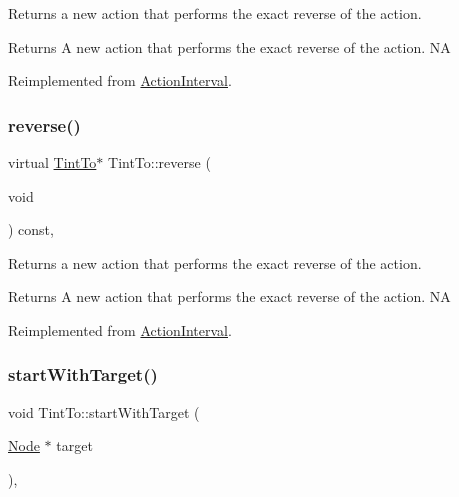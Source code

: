 Returns a new action that performs the exact reverse of the action.

\begin{DoxyReturn}{Returns}
A new action that performs the exact reverse of the action.  NA 
\end{DoxyReturn}


Reimplemented from \hyperlink{classActionInterval_a9f9ac7164036a0bc261a72f62a2b2da7}{Action\+Interval}.

\mbox{\label{classTintTo_af54618f49845bf509f510705e3acfc1f}} 
\subsubsection{\texorpdfstring{reverse()}{reverse()}\hspace{0.1cm}{\footnotesize\ttfamily [2/2]}}
{\footnotesize\ttfamily virtual \hyperlink{classTintTo}{Tint\+To}$\ast$ Tint\+To\+::reverse (\begin{DoxyParamCaption}\item[{void}]{ }\end{DoxyParamCaption}) const\hspace{0.3cm}{\ttfamily [override]}, {\ttfamily [virtual]}}

Returns a new action that performs the exact reverse of the action.

\begin{DoxyReturn}{Returns}
A new action that performs the exact reverse of the action.  NA 
\end{DoxyReturn}


Reimplemented from \hyperlink{classActionInterval_a9f9ac7164036a0bc261a72f62a2b2da7}{Action\+Interval}.

\mbox{\label{classTintTo_a1ef6a2ccefbb95cf2234a6671b73609c}} 
\subsubsection{\texorpdfstring{start\+With\+Target()}{startWithTarget()}\hspace{0.1cm}{\footnotesize\ttfamily [1/2]}}
{\footnotesize\ttfamily void Tint\+To\+::start\+With\+Target (\begin{DoxyParamCaption}\item[{\hyperlink{classNode}{Node} $\ast$}]{target }\end{DoxyParamCaption})\hspace{0.3cm}{\ttfamily [override]}, {\ttfamily [virtual]}}

